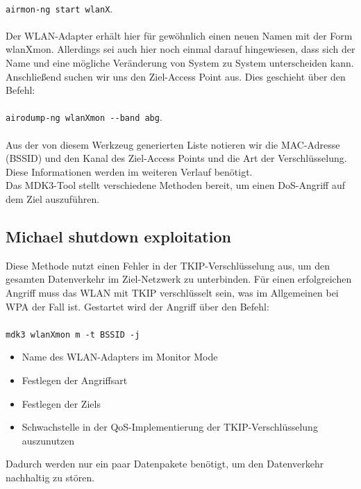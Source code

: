 \\
\colorbox{altgray}{\lstinline|airmon-ng start wlanX|}.\\
\\
Der WLAN-Adapter erhält hier für gewöhnlich einen neuen Namen mit der Form wlanXmon. Allerdings sei auch hier noch einmal darauf hingewiesen, dass sich der Name und eine mögliche Veränderung von System zu System unterscheiden kann.
\\
Anschließend suchen wir uns den Ziel-Access Point aus. Dies geschieht über den Befehl:\\
\\
\colorbox{altgray}{\lstinline|airodump-ng wlanXmon --band abg|}.\\
\\
 Aus der von diesem Werkzeug generierten Liste notieren wir die MAC-Adresse (BSSID) und den Kanal des Ziel-Access Points und die Art der Verschlüsselung. Diese Informationen werden im weiteren Verlauf benötigt.
\\
Das MDK3-Tool stellt verschiedene Methoden bereit, um einen DoS-Angriff auf dem Ziel auszuführen.

\subsection{Michael shutdown exploitation}
Diese Methode nutzt einen Fehler in der TKIP-Verschlüsselung aus, um den gesamten Datenverkehr im Ziel-Netzwerk zu unterbinden. Für einen erfolgreichen Angriff muss das WLAN mit TKIP verschlüsselt sein, was im Allgemeinen bei WPA der Fall ist. Gestartet wird der Angriff über den Befehl:\\
\\
\colorbox{altgray}{\lstinline|mdk3 wlanXmon m -t BSSID -j|}
\begin{itemize}
	\item {} Name des WLAN-Adapters im Monitor Mode
	\item {} Festlegen der Angriffsart
	\item {} Festlegen der Ziels
	\item {} Schwachstelle in der QoS-Implementierung der TKIP-Verschlüsselung auszunutzen
\end{itemize}
Dadurch werden nur ein paar Datenpakete benötigt, um den Datenverkehr nachhaltig zu stören.

